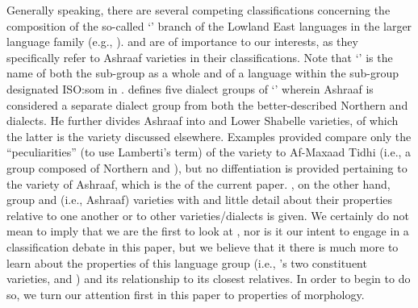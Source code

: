 \documentclass[output=paper]{../langsci/langscibook}
\begin{document}
 Generally speaking, there are several competing classifications concerning the composition of the so-called `' branch of the Lowland East  languages in the larger  language family (e.g., \citealt{Abdhullahi2000,EhretAli1984,Heine1978,Lamberti1984,Moreno1955}). \citet{Lamberti1984} and \citet{EhretAli1984} are of importance to our interests, as they specifically refer to Ashraaf varieties in their classifications. Note that `' is the name of both the sub-group as a whole and of a language within the sub-group designated ISO:som in \citet{Ethnologue19}. \citet{Lamberti1984} defines five dialect groups of `' wherein Ashraaf is considered a separate dialect group from both the better-described Northern and   dialects. He further divides Ashraaf into  and Lower Shabelle varieties, of which the latter is the  variety discussed elsewhere. Examples provided compare only the ``peculiarities'' (to use Lamberti's term) of the  variety to Af-Maxaad Tidhi (i.e., a group composed of Northern and  ), but no diffentiation is provided pertaining to the  variety of Ashraaf, which is the  of the current paper. \citet{EhretAli1984}, on the other hand, group  and  (i.e., Ashraaf) varieties with   and little detail about their properties relative to one another or to other varieties/dialects is given. We certainly do not mean to imply that we are the first to look at , nor is it our intent to engage in a classification debate in this paper, but we believe that it there is much more to learn about the properties of this language group (i.e., 's two constituent varieties,  and ) and its relationship to its closest relatives. In order to begin to do so, we turn our attention first in this paper to properties of  morphology.
 
 
\end{document}
